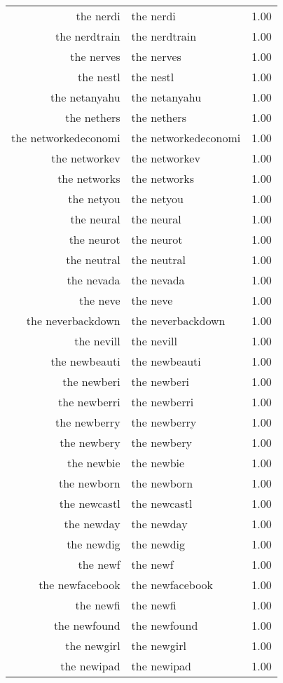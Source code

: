 \begin{table}[ht]
\begin{tabular}{rlr}
  the nerdi & the nerdi & 1.00 \\ 
  the nerdtrain & the nerdtrain & 1.00 \\ 
  the nerves & the nerves & 1.00 \\ 
  the nestl & the nestl & 1.00 \\ 
  the netanyahu & the netanyahu & 1.00 \\ 
  the nethers & the nethers & 1.00 \\ 
  the networkedeconomi & the networkedeconomi & 1.00 \\ 
  the networkev & the networkev & 1.00 \\ 
  the networks & the networks & 1.00 \\ 
  the netyou & the netyou & 1.00 \\ 
  the neural & the neural & 1.00 \\ 
  the neurot & the neurot & 1.00 \\ 
  the neutral & the neutral & 1.00 \\ 
  the nevada & the nevada & 1.00 \\ 
  the neve & the neve & 1.00 \\ 
  the neverbackdown & the neverbackdown & 1.00 \\ 
  the nevill & the nevill & 1.00 \\ 
  the newbeauti & the newbeauti & 1.00 \\ 
  the newberi & the newberi & 1.00 \\ 
  the newberri & the newberri & 1.00 \\ 
  the newberry & the newberry & 1.00 \\ 
  the newbery & the newbery & 1.00 \\ 
  the newbie & the newbie & 1.00 \\ 
  the newborn & the newborn & 1.00 \\ 
  the newcastl & the newcastl & 1.00 \\ 
  the newday & the newday & 1.00 \\ 
  the newdig & the newdig & 1.00 \\ 
  the newf & the newf & 1.00 \\ 
  the newfacebook & the newfacebook & 1.00 \\ 
  the newfi & the newfi & 1.00 \\ 
  the newfound & the newfound & 1.00 \\ 
  the newgirl & the newgirl & 1.00 \\ 
  the newipad & the newipad & 1.00 \\ 

\end{tabular}
\end{table}
